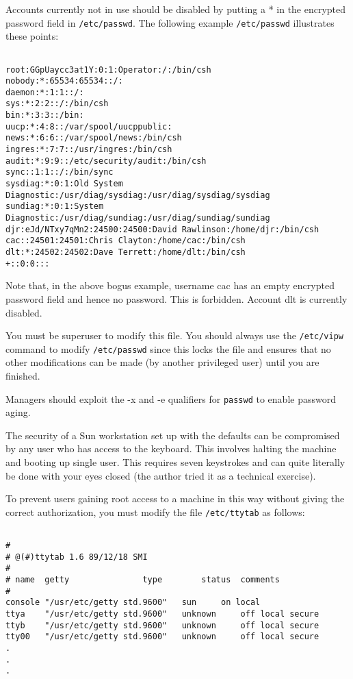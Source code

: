Accounts currently not in use should be disabled by putting a * in the
encrypted password field in {\tt /etc/passwd}. The following example
{\tt /etc/passwd}
illustrates these points:

\begin{verbatim}

root:GGpUaycc3at1Y:0:1:Operator:/:/bin/csh
nobody:*:65534:65534::/:
daemon:*:1:1::/:
sys:*:2:2::/:/bin/csh
bin:*:3:3::/bin:
uucp:*:4:8::/var/spool/uucppublic:
news:*:6:6::/var/spool/news:/bin/csh
ingres:*:7:7::/usr/ingres:/bin/csh
audit:*:9:9::/etc/security/audit:/bin/csh
sync::1:1::/:/bin/sync
sysdiag:*:0:1:Old System Diagnostic:/usr/diag/sysdiag:/usr/diag/sysdiag/sysdiag
sundiag:*:0:1:System Diagnostic:/usr/diag/sundiag:/usr/diag/sundiag/sundiag
djr:eJd/NTxy7qMn2:24500:24500:David Rawlinson:/home/djr:/bin/csh
cac::24501:24501:Chris Clayton:/home/cac:/bin/csh
dlt:*:24502:24502:Dave Terrett:/home/dlt:/bin/csh
+::0:0:::

\end{verbatim}

Note that, in the above bogus example, username cac has an empty encrypted
password field and hence no password. This is forbidden. Account dlt is
currently disabled.

You must be superuser to modify this file. You should always use the
{\tt /etc/vipw} command to modify {\tt /etc/passwd} since this locks the file and
ensures that no other modifications can be made (by another privileged
user) until you are finished.

Managers should exploit the -x and -e qualifiers for {\tt passwd} to enable
password aging.

The security of a Sun workstation set up with the defaults can be compromised by any
user who has access to the keyboard. This involves halting the  machine and
booting up single user. This requires seven keystrokes and can quite literally
be done with your eyes closed (the author tried it as a technical exercise).

To prevent users gaining root access to a machine in this way without
giving the correct authorization, you must modify the file {\tt /etc/ttytab} as
follows:

\begin{verbatim}

#
# @(#)ttytab 1.6 89/12/18 SMI
#
# name	getty				type		status	comments
#
console	"/usr/etc/getty std.9600"	sun		on local
ttya	"/usr/etc/getty std.9600"	unknown		off local secure
ttyb	"/usr/etc/getty std.9600"	unknown		off local secure
tty00	"/usr/etc/getty std.9600"	unknown		off local secure
.
.
.

\end{verbatim}

